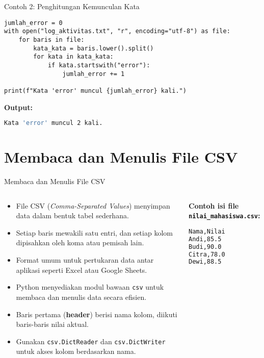 \documentclass[aspectratio=169, table]{beamer}
\begin{document}
\begin{frame}[fragile]{Contoh 2: Penghitungan Kemunculan Kata}
\vspace{20pt}
\begin{lstlisting}[style=PythonStyle, caption={Menghitung kemunculan kata "error"}]
jumlah_error = 0
with open("log_aktivitas.txt", "r", encoding="utf-8") as file:
    for baris in file:
        kata_kata = baris.lower().split()
        for kata in kata_kata:
            if kata.startswith("error"):
                jumlah_error += 1

print(f"Kata 'error' muncul {jumlah_error} kali.")
\end{lstlisting}

\noindent\textbf{Output:}
\begin{lstlisting}[language=bash, caption={Hasil penghitungan kemunculan kata "error"}]
Kata 'error' muncul 2 kali.
\end{lstlisting}
\end{frame}


\section{Membaca dan Menulis File CSV}

\begin{frame}[fragile]{Membaca dan Menulis File CSV}
\vspace{20pt}
\begin{columns}[T, totalwidth=\textwidth]
  \begin{column}{0.65\textwidth}
  \begin{itemize}
    \item File CSV (\textit{Comma-Separated Values}) menyimpan data dalam bentuk tabel sederhana.
    \item Setiap baris mewakili satu entri, dan setiap kolom dipisahkan oleh koma atau pemisah lain.
    \item Format umum untuk pertukaran data antar aplikasi seperti Excel atau Google Sheets.
    \item Python menyediakan modul bawaan \texttt{csv} untuk membaca dan menulis data secara efisien.
    \item Baris pertama (\textbf{header}) berisi nama kolom, diikuti baris-baris nilai aktual.
    \item Gunakan \texttt{csv.DictReader} dan \texttt{csv.DictWriter} untuk akses kolom berdasarkan nama.
  \end{itemize}
  \end{column}

  \begin{column}{0.3\textwidth}
  \vspace{5pt}
  \textbf{Contoh isi file \texttt{nilai\_mahasiswa.csv}:}
  \begin{lstlisting}[language=bash, caption={Cuplikan isi file CSV}]
Nama,Nilai
Andi,85.5
Budi,90.0
Citra,78.0
Dewi,88.5
  \end{lstlisting}
  \end{column}
\end{columns}
\end{frame}
\end{document}
